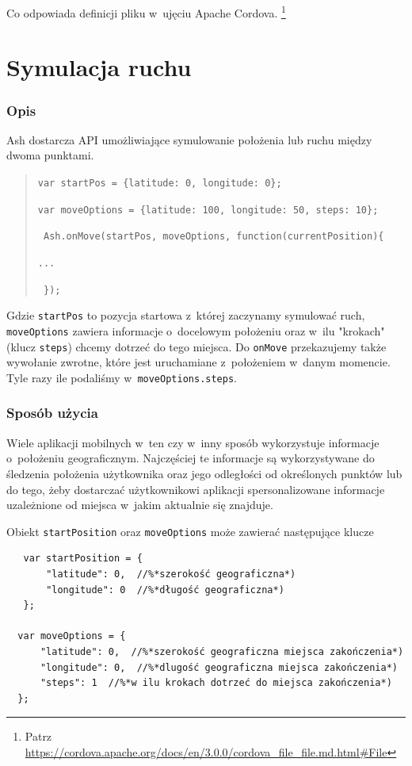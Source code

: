 \documentclass[brudnopis]{xmgr}
\begin{document}
Co odpowiada definicji pliku w~ujęciu Apache Cordova. 
\footnote{Patrz \url{https://cordova.apache.org/docs/en/3.0.0/cordova_file_file.md.html\#File} }

\section{Symulacja ruchu}

\subsubsection{Opis}
Ash dostarcza API umożliwiające symulowanie położenia lub ruchu między dwoma punktami.

\begin{quote}
  \texttt{var startPos = \{latitude: 0, longitude: 0\};}

  \texttt{var moveOptions = \{latitude: 100, longitude: 50, steps: 10\};}

  \texttt{ Ash.onMove(startPos, moveOptions, function(currentPosition)\{  }

    \texttt{...} 

  \texttt{   \});  }
\end{quote}

Gdzie \texttt{startPos} to pozycja startowa z~której zaczynamy symulować ruch, \texttt{moveOptions} zawiera informacje o~docelowym położeniu oraz w~ilu "krokach" (klucz \texttt{steps}) chcemy dotrzeć do tego miejsca. Do \texttt{onMove} przekazujemy także wywołanie zwrotne, które jest uruchamiane z~położeniem w~danym momencie. Tyle razy ile podaliśmy w~\texttt{moveOptions.steps}. 

\subsubsection{Sposób użycia}

Wiele aplikacji mobilnych w~ten czy w~inny sposób wykorzystuje informacje o~położeniu geograficznym. Najczęściej te informacje są wykorzystywane do śledzenia położenia użytkownika oraz jego odległości od określonych punktów lub do tego, żeby dostarczać użytkownikowi aplikacji spersonalizowane informacje uzależnione od miejsca w~jakim aktualnie się znajduje. 

Obiekt \texttt{startPosition} oraz \texttt{moveOptions} może zawierać następujące klucze

\begin{lstlisting}
   var startPosition = {
       "latitude": 0,  //%*szerokość geograficzna*)
       "longitude": 0  //%*długość geograficzna*)
   };
 
  var moveOptions = {
      "latitude": 0,  //%*szerokość geograficzna miejsca zakończenia*)
      "longitude": 0,  //%*dlugość geograficzna miejsca zakończenia*)
      "steps": 1  //%*w ilu krokach dotrzeć do miejsca zakończenia*)
  };
\end{lstlisting}
\end{document}
